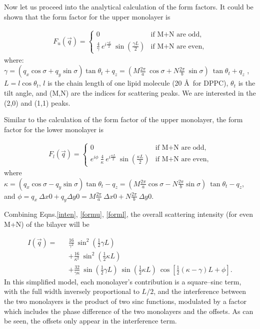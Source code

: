 Now let us proceed into the analytical calculation of the form factors.
It could be shown that the form factor for the upper monolayer is

\begin{eqnarray}
\label{formu}
F_{u}(\vec{q}) = \left\{ 
	\begin{array}{ll}
	0	& \mbox{if M+N are odd,} \\
	\frac{4}{\gamma}\ e^{i \frac{\gamma L}{2}}\ \sin(\frac{\gamma L}{2}) & \mbox{if M+N are even,}
	\end{array}
\right.
\end{eqnarray}
where: \( \gamma = (q_{x} \cos{\sigma} + q_{y} \sin{\sigma}) \tan{\theta_{t}} + q_{z} = (M \frac{2\pi}{a}\ \cos{\sigma} + N \frac{2\pi}{b}\ \sin{\sigma})\ \tan{\theta_{t}} + q_{z} \) ,\( L = l \cos{\theta_{t}}
\), $l$ is the chain length of one lipid molecule (20 \AA\ for DPPC), $\theta_{t}$
is the tilt angle, and (M,N) are the indices for scattering peaks. We are 
interested in the (2,0) and (1,1) peaks.

Similar to the calculation of the form factor of the upper monolayer, the form 
factor for the lower monolayer is

\begin{eqnarray}
\label{forml}
F_{l}(\vec{q}) = \left\{
	\begin{array}{ll}
		0       & \mbox{if M+N are odd,} \\
		e^{i \phi}\ \frac{4}{\kappa}\ e^{i \frac{\kappa L}{2}}\ \sin(\frac{\kappa L}{2}) & \mbox{if M+N are even,}
	\end{array}
\right.
\end{eqnarray}
where  \( \kappa = (q_{x}\cos{\sigma} - q_{y}\sin{\sigma}) \tan{\theta_{t}} 
- q_{z} = (M \frac{2 \pi}{a}\cos{\sigma} - N \frac{2 \pi}{b}\sin{\sigma})\ 
\tan{\theta_{t}} - q_{z} \), and \( \phi = q_{x}\ \Delta x0 + q_{y} \Delta 
y0 = M \frac{2 \pi}{a}\ \Delta x0 + N \frac{2 \pi}{b}\ \Delta y0 \). 

Combining Eqns.\ref{inten}, \ref{formu}, \ref{forml}, the overall scattering
intensity (for even M+N) of the bilayer will be

\begin{eqnarray}
\label{intenfi}
I(\vec{q}) = && \frac{16}{\gamma^2}\ \sin^{2}(\frac{1}{2} \gamma L) \nonumber \\
	&& + \frac{16}{\kappa^2}\ \sin^{2}(\frac{1}{2} \kappa L) \nonumber \\
	&& + \frac{32}{\gamma \kappa}\ \sin(\frac{1}{2} \gamma L)\ 
	\sin(\frac{1}{2} \kappa L)\ \cos[\frac{1}{2}(\kappa-\gamma) L + \phi].
\end{eqnarray}
In this simplified model, each monolayer's contribution is a square--sinc term,
with the full width inversely proportional to $L/2$, and the interference between
the two monolayers is the product of two sinc functions, modulated by a factor
which includes the phase difference of the two monolayers and the offsets. As
can be seen, the offsets only appear in the interference term.

